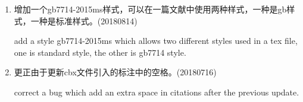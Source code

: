 

\label{up:180814}
\begin{enumerate}

\item 增加一个gb7714-2015ms样式，可以在一篇文献中使用两种样式，一种是gb样式，一种是标准样式。(20180814)

add a style gb7714-2015ms which allows two different styles used in a tex file, one is standard style, the other is gb7714 style.


\item 更正由于更新cbx文件引入的标注中的空格。(20180716)

correct a bug which add an extra space in citations after the previous update.

\end{enumerate}


